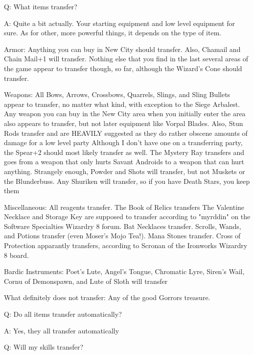 \documentclass[12pt]{article}
\begin{document}
Q: What items transfer?

A: Quite a bit actually. Your starting equipment and low level equipment
for sure. As for other, more powerful things, it depends on the type of
item.

Armor:  Anything you can buy in New City should transfer.  Also, Chamail
        and Chain Mail+1 will transfer.  Nothing else that you find in the
        last several areas of the game appear to transfer though, so far,
        although the Wizard's Cone should transfer.

Weapons:  All Bows, Arrows, Crossbows, Quarrels, Slings, and Sling Bullets
          appear to transfer, no matter what kind, with exception to the
          Siege Arbalest.  Any weapon you can buy in the New City area
          when you initially enter the area also appears to transfer, but
          not later equipment like Vorpal Blades.  Also, Stun Rods
          transfer and are HEAVILY suggested as they do rather obscene
          amounts of damage for a low level party
          Although I don't have one on a transferring party, the Spear+2
          should most likely transfer as well.  The Mystery Ray transfers
          and goes from a weapon that only hurts Savant Androids to a
          weapon that can hurt anything.  Strangely enough, Powder and
          Shots will transfer, but not Muskets or the Blunderbuss.  Any
          Shuriken will transfer, so if you have Death Stars, you keep
          them

Miscellaneous:  All reagents transfer.  The Book of Relics transfers
                The Valentine Necklace and Storage Key are supposed to
                transfer according to "myrddin" on the Software Specialties
                Wizardry 8 forum.  Bat Necklaces transfer.  Scrolls, Wands,
                and Potions transfer (even Moser's Mojo Tea!).  Mana Stones
                transfer.  Cross of Protection apparantly transfers,
                according to Scronan of the Ironworks Wizardry 8 board.

Bardic Instruments: Poet's Lute, Angel's Tongue, Chromatic Lyre,
Siren's Wail, Cornu of Demonspawn, and Lute of Sloth will transfer

What definitely does not transfer:  Any of the good Gorrors treasure.

Q: Do all items transfer automatically?

A: Yes, they all transfer automatically

Q: Will my skills transfer?
\end{document}
